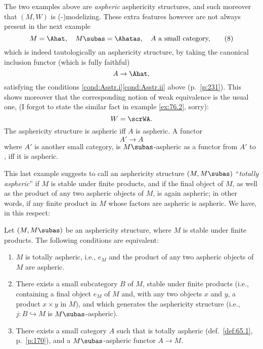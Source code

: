 \enspace
The two examples above are \emph{aspheric} asphericity structures, and
such moreover that $(M,W)$ is (\scrW-)modelizing. These extra features
however are not always present in the next example
\begin{equation}
  \label{eq:76.8}
  M=\Ahat, \quad M\subas=\Ahatas,\quad
  \text{$A$ a small category,}
  \tag{8}
\end{equation}
which is indeed tautologically an asphericity structure, by taking the
canonical inclusion functor (which is fully faithful)
\[ A \to \Ahat,\]
satisfying the conditions \ref{cond:Asstr.i}\ref{cond:Asstr.ii} above
(p.\ \ref{p:231}). This shows moreover that the corresponding notion
of weak equivalence is the usual one, (I forgot to state the similar
fact in example \ref{ex:76.2}, sorry):
\[ W = \scrWA.\]
The asphericity structure is aspheric if{f} $A$ is aspheric. A functor
\[ A'\to A\]
where $A'$ is another small category, is
$M\subas$-aspheric as a functor from $A'$ to \Ahat, if{f} it is
aspheric.

This last example suggests to call an asphericity structure
$(M,M\subas)$ ``\emph{totally aspheric}'' if $M$ is stable under
finite products, and if the final object of $M$, as well as the
product of any two aspheric objects of $M$, is again aspheric; in
other words, if any finite product in $M$ whose factors are aspheric
is aspheric. We have, in this respect:
\addtocounter{propositionnum}{4}
\begin{propositionnum}\label{prop:76.5}
  Let $(M,M\subas)$ be an asphericity structure, where $M$ is stable
  under finite products. The following conditions are equivalent:
  \begin{enumerate}[label=(\roman*),font=\normalfont]
  \item\label{it:76.5.i}
    $M$ is totally aspheric, i.e., $e_M$ and the product of any two
    aspheric objects of $M$ are aspheric.
  \item\label{it:76.5.ii}
    There exists a small subcategory $B$ of $M$, stable under finite
    products \textup(i.e., containing a final object $e_M$ of $M$ and,
    with any two objects $x$ and $y$, a product $x\times y$ in
    $M$\textup), and which generates the asphericity structure
    \textup(i.e., $j:B\hookrightarrow M$ is
    $M\subas$-aspheric\textup).
  \item\label{it:76.5.iii}
    There exists a small category $A$ such that \Ahat{} is totally
    aspheric \textup(def.\ \ref{def:65.1}, p.\ \ref{p:170}\textup),
    and a $M\subas$-aspheric functor $A\to M$.
  \end{enumerate}
\end{propositionnum}

